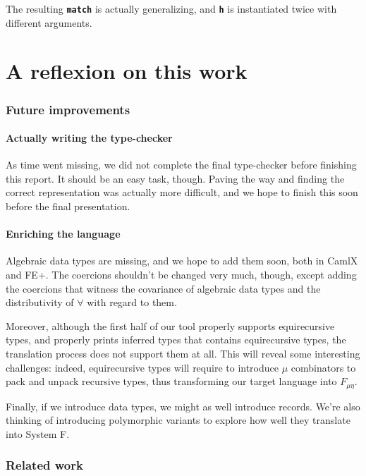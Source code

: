 \documentclass[10pt,a4paper,twoside,titlepage,twocolumn]{article}
\newcommand{\code}[1]{\textbf{\texttt{#1}}}
\begin{document}
The resulting \code{match} is actually generalizing, and \code{h} is
instantiated twice with different arguments.

\part{A reflexion on this work}

\section{Future improvements}

\subsection{Actually writing the type-checker}

As time went missing, we did not complete the final type-checker before
finishing this report. It should be an easy task, though. Paving the way and
finding the correct representation was actually more difficult, and we hope to
finish this soon before the final presentation.

\subsection{Enriching the language}

Algebraic data types are missing, and we hope to add them soon, both in CamlX
and FE+. The coercions shouldn't be changed very much, though, except adding
the coercions that witness the covariance of algebraic data types and the
distributivity of $\forall$ with regard to them.

Moreover, although the first half of our tool properly supports equirecursive
types, and properly prints inferred types that contains equirecursive types, the
translation process does not support them at all.  This will reveal some
interesting challenges: indeed, equirecursive types will require to introduce
$\mu$ combinators to pack and unpack recursive types, thus transforming our
target language into $F_{\mu\eta}$.

Finally, if we introduce data types, we might as well introduce records. We're
also thinking of introducing polymorphic variants to explore how well they
translate into System F.

\section{Related work}
\end{document}
